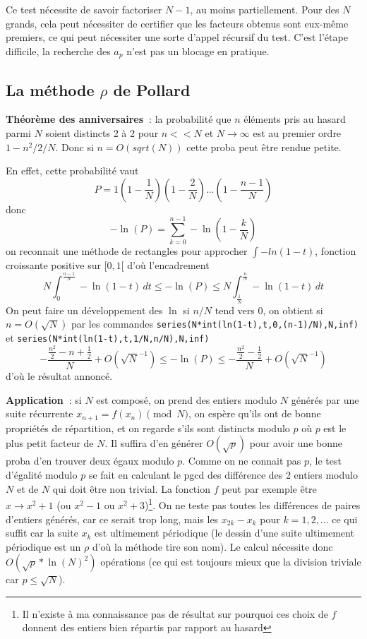 \documentclass[a4paper,11pt]{article}
\begin{document}
Ce test n\'ecessite de savoir factoriser $N-1$, au moins
partiellement. Pour des $N$ grands, cela peut n\'ecessiter
de certifier que les facteurs obtenus sont eux-m\^eme premiers,
ce qui peut n\'ecessiter une sorte d'appel r\'ecursif du test. C'est
l'\'etape difficile, la recherche des $a_p$ n'est pas un blocage en pratique.

\subsection{La m\'ethode $\rho$ de Pollard} 
{\bf Théorème des anniversaires~}: la probabilit\'e que $n$ éléments pris au
hasard parmi $N$ soient distincts 2 à 2 pour 
$n<<N$ et $N\rightarrow \infty$ est au premier ordre 
$1-n^2/2/N$. Donc si $n=O(sqrt(N))$ cette proba peut être rendue petite.

En effet, cette probabilit\'e vaut
$$ P=1(1-\frac1N)(1-\frac2N)...(1-\frac{n-1}{N})$$
donc
$$ -\ln(P)=\sum_{k=0}^{n-1} -\ln(1-\frac{k}{N})  $$
on reconnait une m\'ethode de rectangles pour approcher $\int
-ln(1-t)$, fonction croissante positive sur $[0,1[$ d'o\`u l'encadrement
$$ N\int_{0}^{\frac{n-1}{N}} -\ln(1-t) \, dt \leq -\ln(P) \leq
N\int_{\frac1N}^{\frac{n}{N}} -\ln(1-t) \, dt $$
On peut faire un d\'eveloppement des $\ln$ si $n/N$
tend vers 0, on obtient si $n=O(\sqrt{N})$ par les commandes
\verb|series(N*int(ln(1-t),t,0,(n-1)/N),N,inf)|
et \verb|series(N*int(ln(1-t),t,1/N,n/N),N,inf)|
$$ -\frac{\frac{n^{2}}{2}-n+\frac{1}{2}}{N}+ O(\sqrt{N}^{-1})
\leq -\ln(P) 
\leq -\frac{\frac{n^{2}}{2}-\frac{1}{2}}{N}+ O(\sqrt{N}^{-1})$$
d'o\`u le r\'esultat annonc\'e.

{\bf Application~}: si $N$ est composé, on prend des entiers modulo $N$
générés par une suite 
récurrente $x_{n+1}=f(x_n) \pmod N$, 
on espère qu'ils ont de bonne propriétés de répartition, 
et on regarde s'ils sont distincts modulo $p$ où $p$ est 
le plus petit facteur de $N$. Il suffira d'en générer 
$O(\sqrt{p})$ pour avoir une bonne proba d'en trouver 
deux égaux modulo $p$. 
Comme on ne connait pas $p$, le test d'égalité modulo $p$ 
se fait en calculant le pgcd des différence des 2 entiers modulo $N$
et de $N$ qui doit être non trivial. 
La fonction $f$ peut par exemple être $x \rightarrow x^2+1$ 
(ou $x^2-1$ ou $x^2+3$)\footnote{Il n'existe \`a ma connaissance
pas de résultat sur pourquoi ces choix de $f$ donnent 
des entiers bien répartis par rapport au hasard}. 
On ne teste pas toutes les différences de paires d'entiers générés,
car ce serait trop long,
mais les $x_{2k}-x_k$ pour $k=1,2,...$ 
ce qui suffit car la suite $x_k$ est ultimement périodique 
(le dessin d'une suite ultimement p\'eriodique est un $\rho$
d'o\`u la m\'ethode tire son nom). 
Le calcul nécessite donc $O(\sqrt{p}*\ln(N)^2)$ opérations 
(ce qui est toujours mieux que la division triviale car $p \leq \sqrt{N}$).
\end{document}
